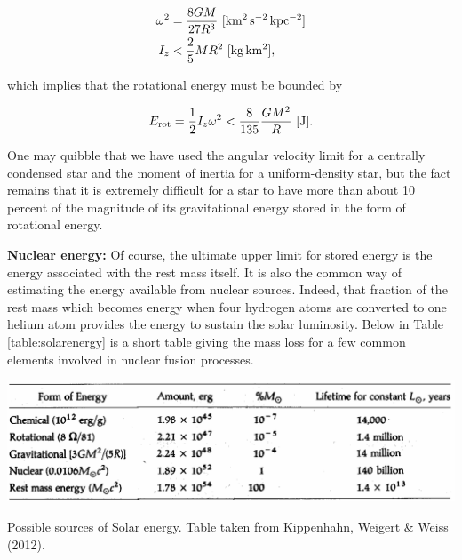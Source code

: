 \documentclass[a4paper,10pt]{article}
\begin{document}
\begin{align*}
    \omega^2 &= \frac{8GM}{27R^3} ~ [{\rm km^2\,s^{-2}\,kpc^{-2}}] \\
    I_z &< \frac{2}{5}MR^2 ~ [{\rm kg\,km^2}],
\end{align*}

{\noindent}which implies that the rotational energy must be bounded by

\begin{align*}
    E_{\rm rot} = \frac{1}{2}I_z\omega^2 < \frac{8}{135}\frac{GM^2}{R} ~ [{\rm J}].
\end{align*}

{\noindent}One may quibble that we have used the angular velocity limit for a centrally condensed star and the moment of inertia for a uniform-density star, but the fact remains that it is extremely difficult for a star to have more than about 10 percent of the magnitude of its gravitational energy stored in the form of rotational energy.

{\noindent}\textbf{Nuclear energy:} Of course, the ultimate upper limit for stored energy is the energy associated with the rest mass itself. It is also the common way of estimating the energy available from nuclear sources. Indeed, that fraction of the rest mass which becomes energy when four hydrogen atoms are converted to one helium atom provides the energy to sustain the solar luminosity. Below in Table \ref{table:solarenergy} is a short table giving the mass loss for a few common elements involved in nuclear fusion processes.

\begin{table}[h]
    \centering
    \includegraphics[width=14cm]{figures/SolarEnergy.png}
    \caption{\footnotesize{Possible sources of Solar energy. Table taken from Kippenhahn, Weigert \& Weiss (2012).}}
    \label{table:solarenergy}
\end{table}
\end{document}
